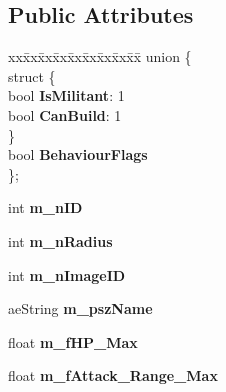 \subsection*{Public Attributes}
\begin{DoxyCompactItemize}
\item 
\begin{tabbing}
xx\=xx\=xx\=xx\=xx\=xx\=xx\=xx\=xx\=\kill
union \{\\
\>struct \{\\
\>\>bool {\bfseries IsMilitant}: 1\\
\>\>bool {\bfseries CanBuild}: 1\\
\>\} \hypertarget{union_c_unit_type_1_1_0D42_ae22aef8db3d0080c94680d58220cc19a}{}\label{union_c_unit_type_1_1_0D42_ae22aef8db3d0080c94680d58220cc19a}
\\
\>bool {\bfseries BehaviourFlags}\\
\}; \hypertarget{class_c_unit_type_a075114b023033e497e083976696ba76c}{}\label{class_c_unit_type_a075114b023033e497e083976696ba76c}
\\

\end{tabbing}\item 
int {\bfseries m\+\_\+n\+ID}\hypertarget{class_c_unit_type_abe46bb4383ca83251a63246cf83a873b}{}\label{class_c_unit_type_abe46bb4383ca83251a63246cf83a873b}

\item 
int {\bfseries m\+\_\+n\+Radius}\hypertarget{class_c_unit_type_af7ed1451bff8ed341c915e3c708c6fdc}{}\label{class_c_unit_type_af7ed1451bff8ed341c915e3c708c6fdc}

\item 
int {\bfseries m\+\_\+n\+Image\+ID}\hypertarget{class_c_unit_type_a03576a3eaafa1a940d3a6c8e543f54c4}{}\label{class_c_unit_type_a03576a3eaafa1a940d3a6c8e543f54c4}

\item 
ae\+String {\bfseries m\+\_\+psz\+Name}\hypertarget{class_c_unit_type_ae0b55afd92ad0eb59e72104391d4221d}{}\label{class_c_unit_type_ae0b55afd92ad0eb59e72104391d4221d}

\item 
float {\bfseries m\+\_\+f\+H\+P\+\_\+\+Max}\hypertarget{class_c_unit_type_aeb8960604639053a4ec4769dfc8442ea}{}\label{class_c_unit_type_aeb8960604639053a4ec4769dfc8442ea}

\item 
float {\bfseries m\+\_\+f\+Attack\+\_\+\+Range\+\_\+\+Max}\hypertarget{class_c_unit_type_a1d622d33fea9367d99784585dabbb1cd}{}\label{class_c_unit_type_a1d622d33fea9367d99784585dabbb1cd}


\end{DoxyCompactItemize}
